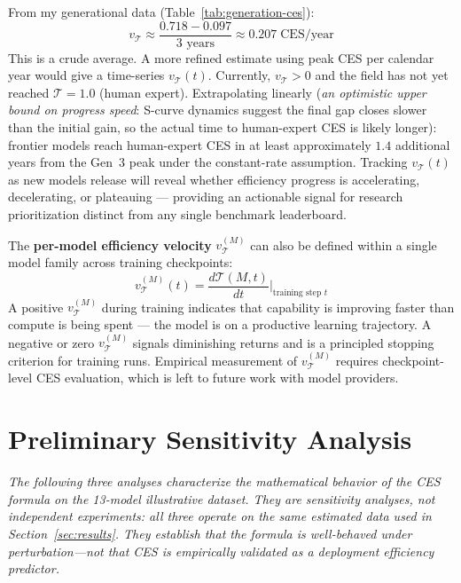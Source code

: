 \documentclass[12pt]{article}
\begin{document}
From my generational data (Table~\ref{tab:generation-ces}):
\begin{equation}
v_{\mathcal{T}} \approx \frac{0.718 - 0.097}{3 \text{ years}} \approx 0.207 \; \text{CES}/\text{year}
\end{equation}
This is a crude average. A more refined estimate using peak CES per calendar year would give a time-series $v_{\mathcal{T}}(t)$. Currently, $v_{\mathcal{T}} > 0$ and the field has not yet reached $\mathcal{T} = 1.0$ (human expert). Extrapolating linearly (\textit{an optimistic upper bound on progress speed}: S-curve dynamics suggest the final gap closes slower than the initial gain, so the actual time to human-expert CES is likely longer): frontier models reach human-expert CES in at least approximately $1.4$ additional years from the Gen~3 peak under the constant-rate assumption. Tracking $v_{\mathcal{T}}(t)$ as new models release will reveal whether efficiency progress is accelerating, decelerating, or plateauing --- providing an actionable signal for research prioritization distinct from any single benchmark leaderboard.

The \textbf{per-model efficiency velocity} $v_{\mathcal{T}}^{(M)}$ can also be defined within a single model family across training checkpoints:
\begin{equation}
v_{\mathcal{T}}^{(M)}(t) = \frac{d\mathcal{T}(M, t)}{dt}\bigg|_{\text{training step } t}
\end{equation}
A positive $v_{\mathcal{T}}^{(M)}$ during training indicates that capability is improving faster than compute is being spent --- the model is on a productive learning trajectory. A negative or zero $v_{\mathcal{T}}^{(M)}$ signals diminishing returns and is a principled stopping criterion for training runs. Empirical measurement of $v_{\mathcal{T}}^{(M)}$ requires checkpoint-level CES evaluation, which is left to future work with model providers.

\section{Preliminary Sensitivity Analysis}

\noindent\textit{The following three analyses characterize the mathematical behavior of the
CES formula on the 13-model illustrative dataset. They are sensitivity analyses, not
independent experiments: all three operate on the same estimated data used in
Section~\ref{sec:results}. They establish that the formula is well-behaved under
perturbation---not that CES is empirically validated as a deployment efficiency predictor.}
\end{document}
